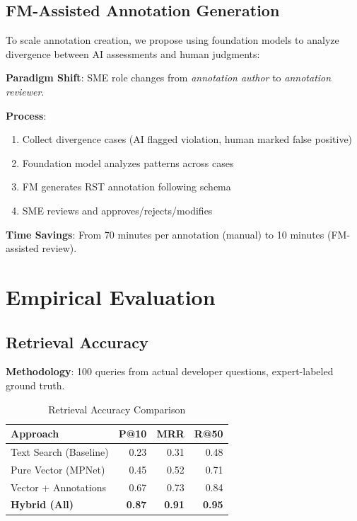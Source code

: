 \documentclass[11pt,letterpaper]{article}
\begin{document}
\subsection{FM-Assisted Annotation Generation}

To scale annotation creation, we propose using foundation models to analyze divergence between AI assessments and human judgments:

\textbf{Paradigm Shift}: SME role changes from \textit{annotation author} to \textit{annotation reviewer}.

\textbf{Process}:
\begin{enumerate}
    \item Collect divergence cases (AI flagged violation, human marked false positive)
    \item Foundation model analyzes patterns across cases
    \item FM generates RST annotation following schema
    \item SME reviews and approves/rejects/modifies
\end{enumerate}

\textbf{Time Savings}: From 70 minutes per annotation (manual) to 10 minutes (FM-assisted review).

\section{Empirical Evaluation}

\subsection{Retrieval Accuracy}

\textbf{Methodology}: 100 queries from actual developer questions, expert-labeled ground truth.

\begin{table}[H]
\centering
\caption{Retrieval Accuracy Comparison}
\begin{tabular}{@{}lrrr@{}}
\toprule
\textbf{Approach} & \textbf{P@10} & \textbf{MRR} & \textbf{R@50} \\
\midrule
Text Search (Baseline) & 0.23 & 0.31 & 0.48 \\
Pure Vector (MPNet) & 0.45 & 0.52 & 0.71 \\
Vector + Annotations & 0.67 & 0.73 & 0.84 \\
\textbf{Hybrid (All)} & \textbf{0.87} & \textbf{0.91} & \textbf{0.95} \\
\bottomrule
\end{tabular}
\end{table}
\end{document}
